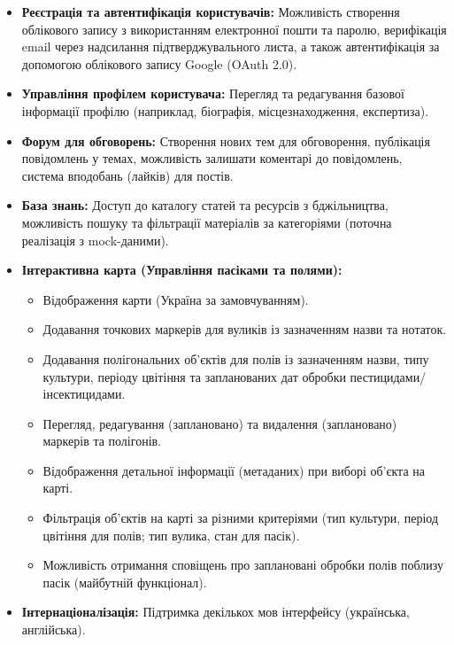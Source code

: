 \begin{itemize}
    \item \textbf{Реєстрація та автентифікація користувачів:} Можливість створення облікового запису з використанням електронної пошти та паролю, верифікація email через надсилання підтверджувального листа, а також автентифікація за допомогою облікового запису Google (OAuth 2.0).
    \item \textbf{Управління профілем користувача:} Перегляд та редагування базової інформації профілю (наприклад, біографія, місцезнаходження, експертиза).
    \item \textbf{Форум для обговорень:} Створення нових тем для обговорення, публікація повідомлень у темах, можливість залишати коментарі до повідомлень, система вподобань (лайків) для постів.
    \item \textbf{База знань:} Доступ до каталогу статей та ресурсів з бджільництва, можливість пошуку та фільтрації матеріалів за категоріями (поточна реалізація з mock-даними).
    \item \textbf{Інтерактивна карта (Управління пасіками та полями):} 
        \begin{itemize}
            \item Відображення карти (Україна за замовчуванням).
            \item Додавання точкових маркерів для вуликів із зазначенням назви та нотаток.
            \item Додавання полігональних об'єктів для полів із зазначенням назви, типу культури, періоду цвітіння та запланованих дат обробки пестицидами/інсектицидами.
            \item Перегляд, редагування (заплановано) та видалення (заплановано) маркерів та полігонів.
            \item Відображення детальної інформації (метаданих) при виборі об'єкта на карті.
            \item Фільтрація об'єктів на карті за різними критеріями (тип культури, період цвітіння для полів; тип вулика, стан для пасік).
            \item Можливість отримання сповіщень про заплановані обробки полів поблизу пасік (майбутній функціонал).
        \end{itemize}
    \item \textbf{Інтернаціоналізація:} Підтримка декількох мов інтерфейсу (українська, англійська).
\end{itemize}

